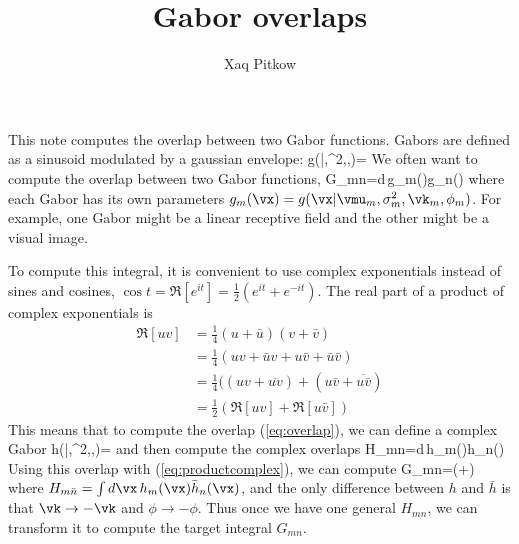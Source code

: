 \documentclass[12pt]{article}
\title{\bf Gabor overlaps}
\author[1,2]{Xaq Pitkow}
\affil[1]{Rice University, Department of Electrical and Computer Engineering}
\affil[2]{Baylor College of Medicine, Department of Neuroscience}
\date{}
\begin{document}
\maketitle



This note computes the overlap between two Gabor functions. Gabors are defined as a sinusoid modulated by a gaussian envelope:
\be
g(\vx|\vmu,\sigma^2,\vk,\phi)=\cos{\left(\vk\cdot(\vx-\vmu)+\phi\right)}
\ee
We often want to compute the overlap between two Gabor functions,
\be
G_{mn}=\int d\vx\,g_m(\vx)g_n(\vx)
\label{eq:overlap}
\ee
where each Gabor has its own parameters $g_m(\vx)=g(\vx|\vmu_m,\sigma^2_m,\vk_m,\phi_m)$. For example, one Gabor might be a linear receptive field and the other might be a visual image.

To compute this integral, it is convenient to use complex exponentials instead of sines and cosines, $\cos{t}=\Re[e^{it}]=\frac{1}{2}(e^{it}+e^{-it})$. The real part of a product of complex exponentials is
\begin{align}
\Re[u v]&=\frac{1}{4}(u+\bar{u})(v+\bar{v})\\
&=\frac{1}{4}(uv+\bar{u}v+u\bar{v}+\bar{u}\bar{v})\\
&=\frac{1}{4}((uv+\overline{uv})+(u\bar{v}+\overline{u\bar{v}})\\
&=\frac{1}{2}(\Re[uv]+\Re[u\bar{v}])
\label{eq:productcomplex}
\end{align}
This means that to compute the overlap (\ref{eq:overlap}), we can define a complex Gabor
\be
h(\vx|\vmu,\sigma^2,\vk,\phi)=
\ee
and then compute the complex overlaps
\be
H_{mn}=\int d\vx\,h_m(\vx)h_n(\vx)
\ee
Using this overlap with (\ref{eq:productcomplex}), we can compute
\be
G_{mn}=(\Re[H_{mn}]+\Re[H_{m\bar{n}}])
\ee
where $H_{m\bar{n}}=\int d\vx\,h_m(\vx)\bar{h}_n(\vx)$, and the only difference between $h$ and $\bar{h}$ is that $\vk\to -\vk$ and $\phi\to -\phi$. Thus once we have one general $H_{mn}$, we can transform it to compute the target integral $G_{mn}$.
\end{document}
